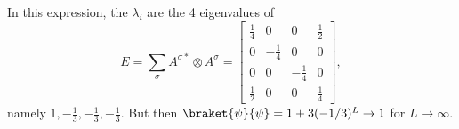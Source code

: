In this expression, the $\lambda_i$ are the 4 eigenvalues of 
\begin{equation}
E = \sum_\sigma A^{\sigma*} \otimes A^{\sigma} = \left[ \begin{array}{cccc} 
\frac{1}{4} & 0 & 0 & \frac{1}{2} \\
0 & -\frac{1}{4} & 0 & 0 \\
0 & 0 & -\frac{1}{4} & 0 \\
\frac{1}{2} & 0 & 0 & \frac{1}{4}
\end{array} \right] ,
\end{equation}
namely $1,-\frac{1}{3},-\frac{1}{3},-\frac{1}{3}$. But then $\braket{\psi}{\psi} = 1 + 3(-1/3)^L \rightarrow 1$ for $L\rightarrow\infty$.

